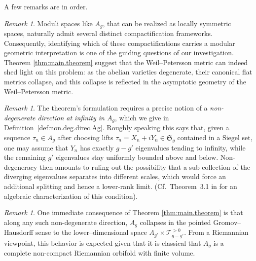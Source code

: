 \documentclass[11pt]{amsart}
\theoremstyle{plain}
\theoremstyle{definition}
\theoremstyle{remark}
\newtheorem{remark}[theorem]{Remark}
\newcommand{\cT}[1]{\mathscr{T}_{#1}^{\scriptscriptstyle{>0}}}
\begin{document}
A few remarks are in order. 

\begin{remark}
    Moduli spaces like $A_g$, that can be realized as locally symmetric spaces, naturally admit several distinct compactification frameworks. Consequently, identifying which of these compactifications carries a modular geometric interpretation is one of the guiding questions of our investigation. Theorem \ref{thm:main.theorem} suggest that the Weil--Petersson metric can indeed shed light on this problem: as the abelian varieties degenerate, their canonical flat metrics collapse, and this collapse is reflected in the asymptotic geometry of the Weil–Petersson metric.
    
\end{remark}

\begin{remark}
    The theorem's formulation requires a precise notion of a \emph{non-degenerate direction at infinity in $A_g$}, which we give in Definition~\ref{def:non.deg.direc.Ag}. Roughly speaking this says that, given a sequence $\tau_n\in A_g$ after choosing lifts $\tau_n=X_n+iY_n\in\mathfrak{S}_g$ contained in a Siegel set, one may assume that $Y_n$ has exactly $g-g'$ eigenvalues tending to infinity, while the remaining $g'$ eigenvalues stay uniformly bounded above and below. Non-degeneracy then amounts to ruling out the possibility that a sub-collection of the diverging eigenvalues separates into different scales, which would force an additional splitting and hence a lower-rank limit. (Cf.\ Theorem~3.1 in \cite{Odaka2019} for an algebraic characterization of this condition).
\end{remark}
 
\begin{remark}
    One immediate consequence of Theorem \ref{thm:main.theorem} is that along any such non-degenerate direction, $A_g$ collapses in the pointed Gromov--Hausdorff sense to the lower--dimen\-sional space $A_{g'}\times\cT{g-g'}$. From a Riemannian viewpoint, this behavior is expected given that it is classical that $A_g$ is a complete non-compact Riemannian orbifold with finite volume.
\end{remark}
\end{document}
